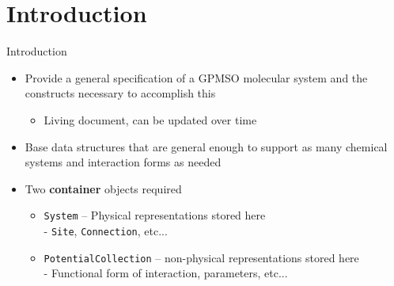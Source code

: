 \documentclass[xcolor=table]{beamer}
\begin{document}
\section{Introduction}
\begin{frame}{Introduction}
    \begin{itemize}
        \item Provide a general specification of a GPMSO molecular system and the constructs necessary to accomplish this
        \begin{itemize}
            \item Living document, can be updated over time
        \end{itemize}
        \item Base data structures that are general enough to support as many chemical systems and interaction forms as needed

        \item Two \textbf{container} objects required
        \begin{itemize}
            \item \texttt{System} -- Physical representations stored here \\
            - \texttt{Site}, \texttt{Connection}, etc...
            \item \texttt{PotentialCollection} --  non-physical representations stored here \\
            - Functional form of interaction, parameters, etc...

        \end{itemize}
    \end{itemize}
\end{frame}
\end{document}
